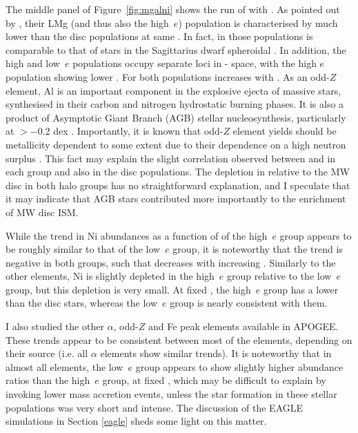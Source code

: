 The middle panel of Figure~\ref{fig:mgalni} shows the run of \alfe{}
with \feh{}.  As pointed out by \citet{2018ApJ...852...49H},
their LMg (and thus also the high~$e$) population is characterised
by much lower \alfe{} than the disc populations at same \feh{}.  In
fact, \alfe{} in those populations is comparable to that
of stars in the Sagittarius dwarf spheroidal \citep{2017ApJ...845..162H}.
 In addition, the high and low~$e$ populations occupy
separate loci in \alfe{}-\feh{} space, with the high $e$
population showing lower \alfe{}.  For both populations \alfe{}
increases with \feh{}. As an odd-$Z$ element, Al is an important
component in the explosive ejecta of massive stars, synthesised in
their carbon and nitrogen hydrostatic burning phases. It is also a
product of Asymptotic Giant Branch (AGB) stellar nucleosynthesis,
particularly at \feh{}$> -0.2$ dex \citep[see,
e.g.][]{2016arXiv160408613A}. Importantly, it is known that odd-$Z$
element yields should be metallicity dependent to some extent due
to their dependence on a high neutron surplus
\citep[e.g.][]{1996snih.book.....A}. This fact may explain the
slight correlation observed between \alfe{} and \feh{} in each group
and also in the disc populations.  The depletion in \alfe{} relative
to the MW disc in both halo groups has no
straightforward explanation, and I speculate that it may indicate
that AGB stars contributed more importantly to the enrichment of
MW disc ISM.


While the trend in Ni abundances as a function of \feh{} of the
high~$e$ group appears to be roughly similar to that of the low~$e$
group, it is noteworthy that the trend is negative in both groups,
such that \nife{} decreases with increasing \feh{}.  Similarly to
the other elements, Ni is slightly depleted in the high~$e$ group
relative to the low~$e$ group, but this depletion is very small.
At fixed \feh{}, the high~$e$ group has a lower \nife{} than the
disc stars, whereas the low~$e$ group is nearly consistent
with them. 

I also studied the other $\alpha$, odd-$Z$ and Fe peak elements
available in APOGEE. These trends appear to be consistent between
most of the elements, depending on their source (i.e. all $\alpha$ elements show similar trends). It is noteworthy that in almost all elements,
the low~$e$ group appears to show slightly higher abundance ratios
than the high~$e$ group, at fixed \feh{}, which may be difficult
to explain by invoking lower mass accretion events, unless the star
formation in these stellar populations was very short and intense.
The discussion of the EAGLE simulations in Section \ref{eagle} sheds
some light on this matter.  


